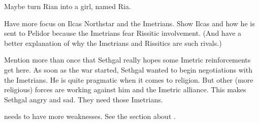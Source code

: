 \begin{changes}
    Maybe turn Rian into a girl, named Ria.
  
  \begin{comment}\paragraph{Telcastora Ilcas}\end{comment}
    Have more focus on Ilcas Northstar and the Imetrians. 
    Show Ilcas and how he is sent to Pelidor because the Imetrians fear Rissitic involvement. 
    (And have a better explanation of why the Imetrians and Rissitics are such rivals.)
  
  \begin{comment}
    \paragraph{Sethgal}
  \end{comment}
    Mention more than once that Sethgal really hopes some Imetric reinforcements get here.
    As soon as the war started, Sethgal wanted to begin negotiations with the Imetrians. 
    He is quite pragmatic when it comes to religion.
    But other (more religious) forces are working against him and the Imetric alliance.
    This makes Sethgal angry and sad.
    They need those Imetrians. 
  
  \begin{comment}
    \paragraph{\Teshrial}
  \end{comment}
  \changesitem{\Teshrial}
    \Teshrial needs to have more weaknesses.
    See the section about . 
\end{changes}





